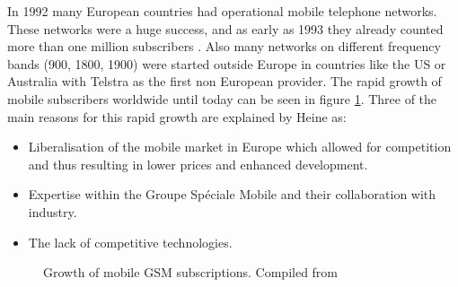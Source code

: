In 1992 many European countries had operational mobile telephone networks.
These networks were a huge success, and as early as 1993 they already counted more than one million subscribers \cite{GSM2009}.
Also many networks on different frequency bands (900\MHz, 1800\MHz, 1900\MHz) were started outside Europe in countries like the US or Australia with Telstra as the first non European provider.
The rapid growth of mobile subscribers worldwide until today can be seen in figure \ref{fig:gsm_growth}.
Three of the main reasons for this rapid growth are explained by Heine \cite{protocols1999} as:
\begin{itemize}
	\item Liberalisation of the mobile market in Europe which allowed for competition and thus resulting in lower prices and enhanced development.
	\item Expertise within the Groupe Sp\'{e}ciale Mobile and their collaboration with industry.
	\item The lack of competitive technologies.
\end{itemize}

\begin{figure}
\centering
{}
\caption{Growth of mobile GSM subscriptions. Compiled from \cite{GSM2009,GSM_history2011,GSM_stats2011}}
\label{fig:gsm_growth}
\end{figure}


